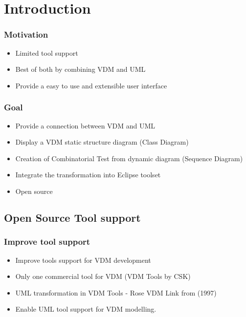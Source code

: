 %
%
\section{Introduction}
%
%
\frame
{
  \frametitle{Motivation}

\begin{center}
  \begin{itemize}
  		\item Limited tool support
  		\item Best of both by combining VDM and UML
  		\item Provide a easy to use and extensible user interface
  \end{itemize}
\end{center}
}



%
%
\frame
{
  \frametitle{Goal}

\begin{center}
  \begin{itemize}
  		\item Provide a connection between VDM and UML
  		\item Display a VDM static structure diagram (Class Diagram)
  		\item Creation of Combinatorial Test from dynamic diagram (Sequence Diagram)
  		\item Integrate the transformation into Eclipse toolset
  		\item Open source
	  	
  \end{itemize}
\end{center}
}

\subsection{Open Source Tool support}
%
%
\frame
{
  \frametitle{Improve tool support}
\begin{center}
  \begin{itemize}
  		\item Improve tools support for VDM development
  		\item Only one commercial tool for VDM (VDM Tools by CSK)
  		\item UML transformation in VDM Tools - Rose VDM Link from (1997)
  		\item Enable UML tool support for VDM modelling.
	  	
  \end{itemize}

\end{center}
}

